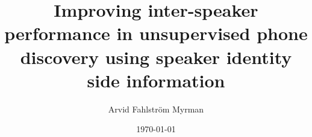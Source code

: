 \documentclass{kththesis}
\title{Improving inter-speaker performance in unsupervised phone discovery using speaker identity side information}
\author{Arvid Fahlström Myrman}
\date{\today}
\begin{document}
\flyleaf



\tableofcontents
\mainmatter






\printbibliography
\end{document}
